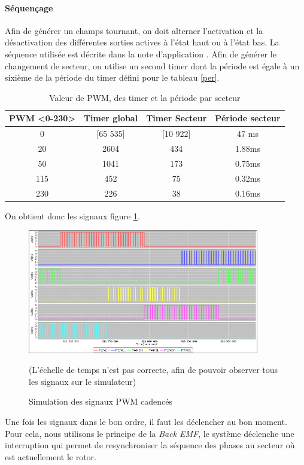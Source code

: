   			\paragraph{Séquençage}
  			Afin de générer un champs tournant, on doit alterner l'activation et la désactivation des différentes sorties actives à l'état haut ou à l'état bas. La séquence utilisée est décrite dans la note d'application \cite{AN857}. Afin de générer le changement de secteur, on utilise un second timer dont la période est égale à un sixième de la période du timer défini pour le tableau \ref{per}.
  			\begin{table}[h]
			\centering
			\begin{center}
			\begin{tabular}{|c|c|c|c|}
			PWM <0-230> & Timer global & Timer Secteur &  Période secteur \\ 
			\hline 
			0 & [65 535]&[10 922]& 47 ms\\ 
			20 &  2604 &434 &1.88ms\\ 
			50 &  1041& 173&0.75ms\\ 
			115 &  452& 75&0.32ms\\ 
			230 &  226& 38&0.16ms\\ 
			\end{tabular} 
			\end{center}
			\caption{Valeur de PWM, des timer et la période par secteur}
			\end{table}
  			On obtient donc les signaux figure \ref{imgPWMCad}.
  			\begin{figure}[h]\begin{center}
	  			\includegraphics[width=0.9\textwidth]{../Illus/PWMCadence2015.png}
	  			\caption{Simulation des signaux PWM cadencés}\small(L'échelle de temps n'est pas correcte, afin de pouvoir observer tous les signaux sur le simulateur)
	  			\label{imgPWMCad}
	  			\end{center}
  			\end{figure}
  			Une fois les signaux dans le bon ordre, il faut les déclencher au bon moment. Pour cela, nous utilisons le principe de la \textit{Back EMF}, le système déclenche une interruption qui permet de resynchroniser la séquence des phases au secteur où est actuellement le rotor.

